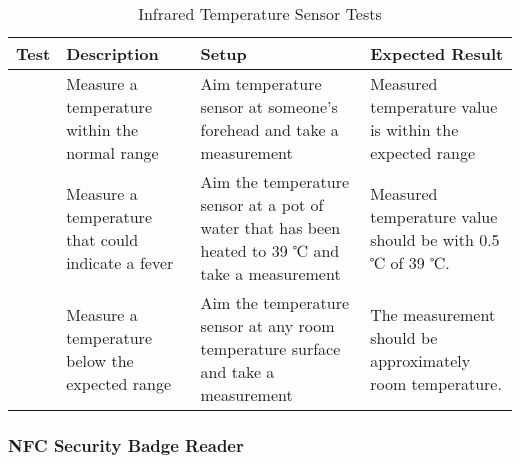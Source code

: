 \begin{table*}[htb]
\centering
\begin{tabular}{>{\centering\arraybackslash}m{0.75cm}|>{\centering\arraybackslash}m{4cm}|>{\centering\arraybackslash}m{4.5cm}|>{\centering\arraybackslash}m{4cm}}
\toprule
Test & Description & Setup & Expected Result \\
\midrule
1 & Measure a temperature within the normal range & Aim temperature sensor at
someone's forehead and take a measurement & Measured temperature value is within
the expected range \\
\hline
2 & Measure a temperature that could indicate a fever & Aim the temperature
sensor at a pot of water that has been heated to 39 ℃ and take a measurement &
Measured temperature value should be with 0.5 ℃ of 39 ℃. \\
\hline
3 & Measure a temperature below the expected range & Aim the temperature sensor
at any room temperature surface and take a measurement & The measurement should be
approximately room temperature. \\
\bottomrule
\end{tabular}
\caption{Infrared Temperature Sensor Tests}
\label{table:ir-tests}
\end{table*}

\subsubsection{NFC Security Badge Reader}

